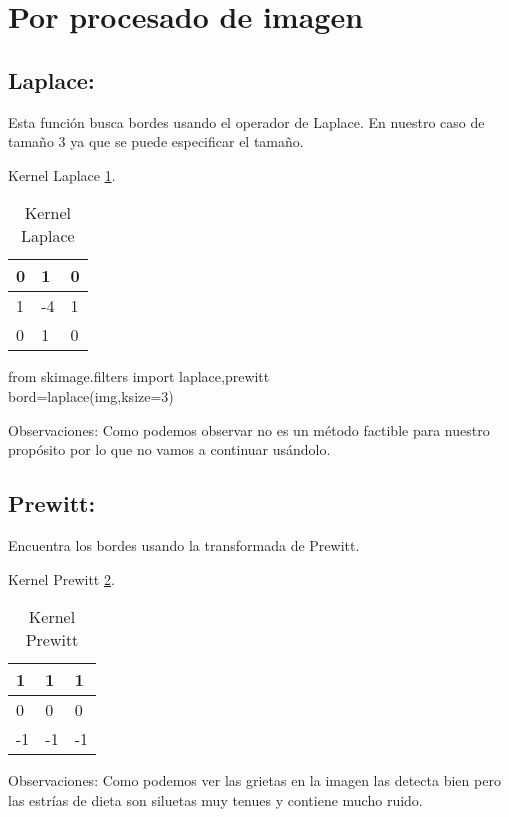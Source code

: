 
\section{Por procesado de imagen}
\subsection{Laplace:}
Esta función busca bordes usando el operador de Laplace. En nuestro caso de tamaño 3 ya que se puede especificar el tamaño.

Kernel Laplace \ref{F_k1}.
\begin{table}[]
	\centering
	\caption{Kernel Laplace}
	\label{F_k1}
	\begin{tabular}{|l|l|l|}
		\hline
		0 & 1  & 0 \\ \hline
		1 & -4 & 1 \\ \hline
		0 & 1  & 0 \\ \hline
	\end{tabular}
\end{table}

from skimage.filters import laplace,prewitt\\
bord=laplace(img,ksize=3)

Observaciones:
Como podemos observar no es un método factible para nuestro propósito por lo que no vamos a continuar usándolo.

\subsection{Prewitt:}

Encuentra los bordes usando la transformada de Prewitt.

Kernel Prewitt \ref{F_k2}.
\begin{table}[]
	\centering
	\caption{Kernel Prewitt}
	\label{F_k2}
	\begin{tabular}{|l|l|l|}
		\hline
		1  & 1   & 1 \\ \hline
		0  & 0   & 0 \\ \hline
		-1 & -1  & -1 \\ \hline
	\end{tabular}
\end{table}



Observaciones:
Como podemos ver las grietas en la imagen las detecta bien pero las estrías de dieta son siluetas muy tenues y contiene mucho ruido.



